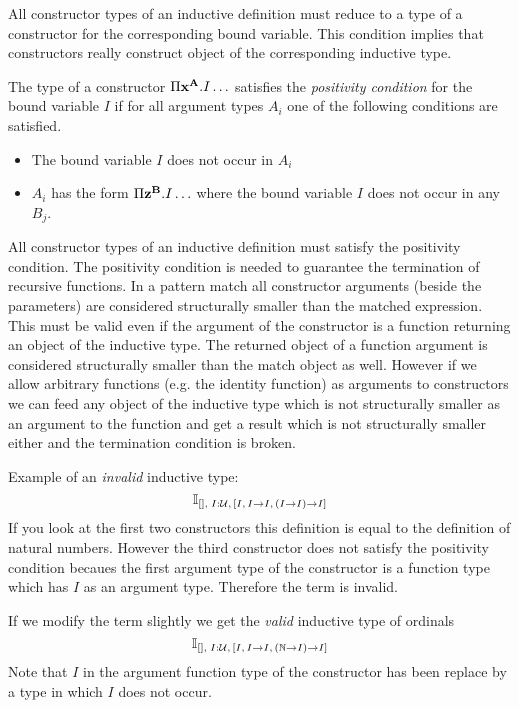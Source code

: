 All constructor types of an inductive definition must reduce to a type of a
constructor for the corresponding bound variable. This condition implies that
constructors really construct object of the corresponding inductive type.


\begin{definition}
  The type of a constructor $\Pi \mathbf{x}^{\mathbf{A}}. I \ldots$ satisfies the
  \emph{positivity condition} for the bound variable $I$ if for all argument
  types $A_i$ one of the following conditions are satisfied.
  \begin{itemize}
  \item The bound variable $I$ does not occur in $A_i$

  \item $A_i$ has the form $\Pi \mathbf{z}^{\mathbf{B}} . I \ldots$ where the bound
    variable $I$ does not occur in any $B_j$.
  \end{itemize}
\end{definition}

All constructor types of an inductive definition must satisfy the positivity
condition. The positivity condition is needed to guarantee the termination of
recursive functions. In a pattern match all constructor arguments (beside the
parameters) are considered structurally smaller than the matched
expression. This must be valid even if the argument of the constructor is a
function returning an object of the inductive type. The returned object of a
function argument is considered structurally smaller than the match object as
well. However if we allow arbitrary functions (e.g. the identity function) as
arguments to constructors we can feed any object of the inductive type which
is not structurally smaller as an argument to the function and get a result
which is not structurally smaller either and the termination condition is
broken.

Example of an \emph{invalid} inductive type:
$$
\mathbb{I}_{[],\; I:{\cal{U}},\, [I,\, I \to I, \, (I \to I) \to I]}
$$
If you look at the first two constructors this definition is equal to the
definition of natural numbers. However the third constructor does not satisfy
the positivity condition becaues the first argument type of the constructor is
a function type which has $I$ as an argument type. Therefore the term is
invalid.

If we modify the term slightly we get the \emph{valid} inductive type of
ordinals
$$
\mathbb{I}_{[],\; I:{\cal{U}},\, [I,\, I \to I, \, ({\mathbb{N}} \to I) \to I]}
$$
Note that $I$ in the argument function type of the constructor has been
replace by a type in which $I$ does not occur.




